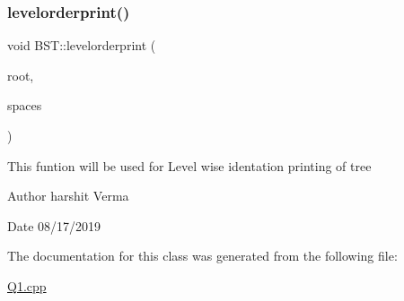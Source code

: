 \subsubsection{\texorpdfstring{levelorderprint()}{levelorderprint()}}
{\footnotesize\ttfamily void B\+S\+T\+::levelorderprint (\begin{DoxyParamCaption}\item[{\hyperlink{classBSTnode}{B\+S\+Tnode} $\ast$}]{root,  }\item[{int}]{spaces }\end{DoxyParamCaption})\hspace{0.3cm}{\ttfamily [inline]}}

This funtion will be used for Level wise identation printing of tree \begin{DoxyAuthor}{Author}
harshit Verma 
\end{DoxyAuthor}
\begin{DoxyDate}{Date}
08/17/2019 
\end{DoxyDate}


The documentation for this class was generated from the following file\+:\begin{DoxyCompactItemize}
\item 
\hyperlink{Q1_8cpp}{Q1.\+cpp}\end{DoxyCompactItemize}
